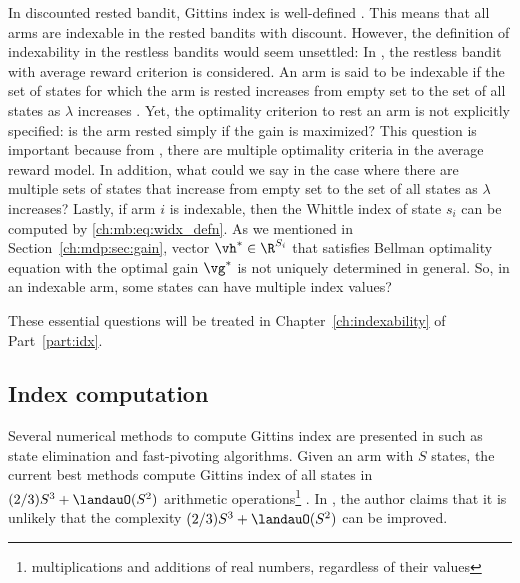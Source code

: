 In discounted rested bandit, Gittins index is well-defined \cite{chakravorty2014multi}.
This means that all arms are indexable in the rested bandits with discount.
However, the definition of indexability in the restless bandits would seem unsettled:
In \cite[Chapter~14]{whittle1996optimal}, the restless bandit with average reward criterion is considered.
An arm is said to be indexable if the set of states for which the arm is rested increases from empty set to the set of all states as $\lambda$ increases \cite[Page~280]{whittle1996optimal}.
Yet, the optimality criterion to rest an arm is not explicitly specified: is the arm rested simply if the gain is maximized?
This question is important because from \cite{puterman2014markov}, there are multiple optimality criteria in the average reward model.
In addition, what could we say in the case where there are multiple sets of states that increase from empty set to the set of all states as $\lambda$ increases?
Lastly, if arm $i$ is indexable, then the Whittle index of state $s_i$ can be computed by \eqref{ch:mb:eq:widx_defn}.
As we mentioned in Section~\ref{ch:mdp:sec:gain}, vector $\vh^*\in\R^{S_i}$ that satisfies Bellman optimality equation with the optimal gain $\vg^*$ is not uniquely determined in general.
So, in an indexable arm, some states can have multiple index values?

These essential questions will be treated in Chapter~\ref{ch:indexability} of Part~\ref{part:idx}.

\subsection{Index computation}

Several numerical methods to compute Gittins index are presented in \cite{chakravorty2014multi} such as state elimination \cite{sonin2008generalized} and fast-pivoting \cite{nino20072} algorithms.
Given an arm with $S$ states, the current best methods compute Gittins index of all states in $(2/3)S^3+\landauO(S^2)$ arithmetic operations\footnote{multiplications and additions of real numbers, regardless of their values} \cite{chakravorty2014multi}.
In \cite[Page~4]{nino2020fast}, the author claims that it is unlikely that the complexity $(2/3)S^3+\landauO(S^2)$ can be improved.

